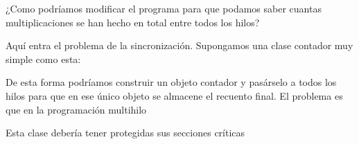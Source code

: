\documentclass[letterpaper,10pt,spanish]{sphinxmanual}
\begin{document}
¿Como podríamos modificar el programa para que podamos saber cuantas multiplicaciones se han hecho en total entre todos los hilos?

Aquí entra el problema de la sincronización. Supongamos una clase contador muy simple como esta:

%
\begin{sphinxVerbatim}[commandchars=\\\{\}]
 
         
         
          
          
                 
\end{sphinxVerbatim}

De esta forma podríamos construir un objeto contador y pasárselo a todos los hilos para que en ese único objeto se almacene el recuento final. El problema es que en la programación multihilo 

Esta clase debería tener protegidas sus secciones críticas

%
\begin{sphinxVerbatim}[commandchars=\\\{\}]
 
         
         
           
           
                 
\end{sphinxVerbatim}
\end{document}
